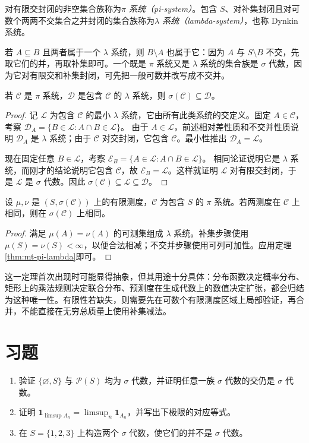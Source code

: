 \begin{definition}
对有限交封闭的非空集合族称为\emph{$\pi$ 系统（pi-system）}。包含 $S$、对补集封闭且对可数个两两不交集合之并封闭的集合族称为\emph{$\lambda$ 系统（lambda-system）}，也称 Dynkin 系统。
\end{definition}
若 $A\subseteq B$ 且两者属于一个 $\lambda$ 系统，则 $B\setminus A$ 也属于它：因为 $A$ 与 $S\setminus B$ 不交，先取它们的并，再取补集即可。一个既是 $\pi$ 系统又是 $\lambda$ 系统的集合族是 $\sigma$ 代数，因为它对有限交和补集封闭，可先把一般可数并改写成不交并。

\begin{theorem}[$\pi$--$\lambda$ 定理]
若 $\mathcal C$ 是 $\pi$ 系统，$\mathcal D$ 是包含 $\mathcal C$ 的 $\lambda$ 系统，则 $\sigma(\mathcal C)\subseteq\mathcal D$。
\label{thm:mt-pi-lambda}
\end{theorem}
\begin{proof}
记 $\mathcal L$ 为包含 $\mathcal C$ 的最小 $\lambda$ 系统，它由所有此类系统的交定义。固定 $A\in\mathcal C$，考察
$\mathcal D_A=\{B\in\mathcal L:A\cap B\in\mathcal L\}$。
由于 $A\in\mathcal L$，前述相对差性质和不交并性质说明 $\mathcal D_A$ 是 $\lambda$ 系统；由于 $\mathcal C$ 对交封闭，它包含 $\mathcal C$。最小性推出 $\mathcal D_A=\mathcal L$。

现在固定任意 $B\in\mathcal L$，考察
$\mathcal E_B=\{A\in\mathcal L:A\cap B\in\mathcal L\}$。
相同论证说明它是 $\lambda$ 系统，而刚才的结论说明它包含 $\mathcal C$，故 $\mathcal E_B=\mathcal L$。这样就证明 $\mathcal L$ 对有限交封闭，于是 $\mathcal L$ 是 $\sigma$ 代数。因此 $\sigma(\mathcal C)\subseteq\mathcal L\subseteq\mathcal D$。
\end{proof}

\begin{corollary}[有限测度的唯一性]
设 $\mu,\nu$ 是 $(S,\sigma(\mathcal C))$ 上的有限测度，$\mathcal C$ 为包含 $S$ 的 $\pi$ 系统。若两测度在 $\mathcal C$ 上相同，则在 $\sigma(\mathcal C)$ 上相同。
\label{cor:mt-finite-uniqueness}
\end{corollary}
\begin{proof}
满足 $\mu(A)=\nu(A)$ 的可测集组成 $\lambda$ 系统。补集步骤使用 $\mu(S)=\nu(S)<\infty$，以便合法相减；不交并步骤使用可列可加性。应用定理\ref{thm:mt-pi-lambda}即可。
\end{proof}
这一定理首次出现时可能显得抽象，但其用途十分具体：分布函数决定概率分布、矩形上的乘法规则决定联合分布、预测度在生成代数上的数值决定扩张，都会归结为这种唯一性。有限性若缺失，则需要先在可数个有限测度区域上局部验证，再合并，不能直接在无穷总质量上使用补集减法。

\section{习题}
\begin{enumerate}
 \item 验证 $\{\varnothing,S\}$ 与 $\mathcal P(S)$ 均为 $\sigma$ 代数，并证明任意一族 $\sigma$ 代数的交仍是 $\sigma$ 代数。
 \item 证明 $\mathbf1_{\limsup A_n}=\limsup_n\mathbf1_{A_n}$，并写出下极限的对应等式。
 \item 在 $S=\{1,2,3\}$ 上构造两个 $\sigma$ 代数，使它们的并不是 $\sigma$ 代数。
\end{enumerate}

